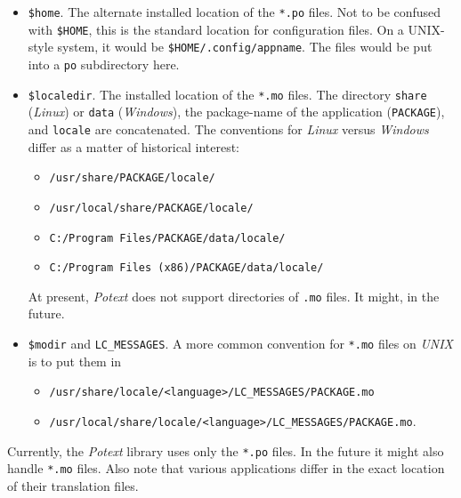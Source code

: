 \documentclass[
 11pt,
 twoside,
 a4paper,
 final                                 %
]{article}
\begin{document}
\begin{itemize}
\begin{itemize}
         \end{itemize}
      \item \texttt{\$home}. The alternate installed
         location of the \texttt{*.po} files.
         Not to be confused with \texttt{\$HOME}, this is
         the standard location for configuration files.
         On a UNIX-style system, it would be \linebreak
         \texttt{\$HOME/.config/appname}.
         The files would be put into a \texttt{po} subdirectory here.
      \item \texttt{\$localedir}. The installed
         location of the \texttt{*.mo} files.
         The directory \texttt{share} (\textsl{Linux})
         or \texttt{data} (\textsl{Windows}),
         the package-name of the application
         (\texttt{PACKAGE}), and \texttt{locale} are concatenated.
         The conventions for \textsl{Linux} versus \textsl{Windows}
         differ as a matter of historical interest:
         \begin{itemize}
            \item \texttt{/usr/share/PACKAGE/locale/}
            \item \texttt{/usr/local/share/PACKAGE/locale/}
            \item \texttt{C:/Program Files/PACKAGE/data/locale/}
            \item \texttt{C:/Program Files (x86)/PACKAGE/data/locale/}
         \end{itemize}
            At present, \textsl{Potext} does not support directories of
            \texttt{.mo} files. It might, in the future.
      \item \texttt{\$modir} and \texttt{LC\_MESSAGES}.
            A more common convention for
            \texttt{*.mo} files on \textsl{UNIX} is to put them in
         \begin{itemize}
            \item \texttt{/usr/share/locale/<language>/LC\_MESSAGES/PACKAGE.mo}
            \item \texttt{/usr/local/share/locale/<language>/LC\_MESSAGES/PACKAGE.mo}.
         \end{itemize}
   \end{itemize}

   Currently, the \textsl{Potext} library uses only the \texttt{*.po} files.
   In the future it might also handle \texttt{*.mo} files.
   Also note that various applications differ in the exact location of their
   translation files.
\end{document}
